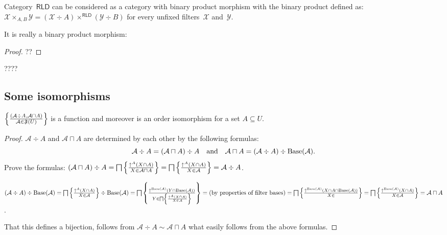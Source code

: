 \begin{defn}
Category~$\mathsf{RLD}$ can be considered as a category
with binary product morphism with the binary product
defined as:
$\mathcal{X}\times_{A,B}\mathcal{Y}=
(\mathcal{X}\div A)\times^{\mathsf{RLD}}(\mathcal{Y}\div B)$ for every unfixed filters~$\mathcal{X}$
and~$\mathcal{Y}$.
\end{defn}

It is really a binary product morphism:

\begin{proof}
??
\end{proof}


????

\subsection{Some isomorphisms}

\begin{prop}
  $\left\{ \frac{ (\mathcal{A} \div A , \mathcal{A} \sqcap A) }{
  \mathcal{A} \in \mathfrak{F} (U) }\right\}$ is a function and
  moreover is an order isomorphism for a set $A \subseteq U$.
\end{prop}

\begin{proof}
  $\mathcal{A} \div A$ and $\mathcal{A} \sqcap A$ are determined by each other
  by the following formulas:
  \[ \mathcal{A} \div A = (\mathcal{A} \sqcap A) \div A \quad
     \text{and} \quad \mathcal{A} \sqcap A = (\mathcal{A} \div A) \div
     \operatorname{Base} (\mathcal{A}) . \]
  Prove the formulas: $(\mathcal{A} \sqcap A) \div A = \bigsqcap \left\{ \frac{
  \uparrow^A (X \cap A) }{ X \in \mathcal{A} \sqcap A
  }\right\} = \bigsqcap \left\{ \frac{ \uparrow^A (X \cap A) }{
  X \in \mathcal{A} }\right\} = \mathcal{A} \div A$.
  
  $(\mathcal{A} \div A) \div \operatorname{Base} (\mathcal{A}) = \bigsqcap \left\{ \frac{
  \uparrow^A (X \cap A) }{ X \in \mathcal{A} }\right\}
  \div \operatorname{Base} (\mathcal{A}) = \bigsqcap \left\{ \frac{ \uparrow^{\operatorname{Base}
  (\mathcal{A})} (Y \cap \operatorname{Base} (\mathcal{A})) }{
  Y \in \bigsqcap \left\{ \frac{ \uparrow^A (X \cap A) }{
  X \in \mathcal{A} }\right\} }\right\} = \text{(by properties of
  filter bases)} = \bigsqcap \left\{ \frac{ \uparrow^{\operatorname{Base} (\mathcal{A})} (X
  \cap A \cap \operatorname{Base} (\mathcal{A})) }{ X \in
  }\right\} = \bigsqcap \left\{ \frac{ \uparrow^{\operatorname{Base}
  (\mathcal{A})} (X \cap A) }{ X \in \mathcal{A}
  }\right\} = \mathcal{A} \sqcap A$.
  
  That this defines a bijection, follows from $\mathcal{A} \div A \sim
  \mathcal{A} \sqcap A$ what easily follows from the above formulas.
\end{proof}

